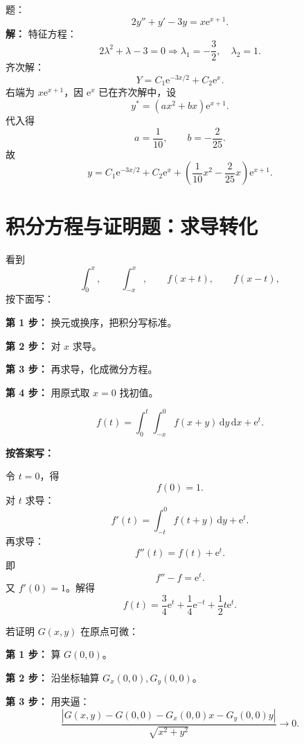 \documentclass[11pt,a4paper,UTF8]{ctexart}
\newcommand{\dd}{\,\mathrm d}
\newcommand{\ee}{\mathrm e}
\begin{document}
\begin{answerbox}[2023--2024 大题：二阶常系数非齐次]
题：
\[
2y''+y'-3y=x\ee^{x+1}.
\]
\textbf{解：}
特征方程：
\[
2\lambda^2+\lambda-3=0
\Rightarrow \lambda_1=-\frac32,\quad \lambda_2=1.
\]
齐次解：
\[
Y=C_1\ee^{-3x/2}+C_2\ee^x.
\]
右端为 \(x\ee^{x+1}\)，因 \(\ee^x\) 已在齐次解中，设
\[
y^*=(ax^2+bx)\ee^{x+1}.
\]
代入得
\[
a=\frac1{10},\qquad b=-\frac2{25}.
\]
故
\[
\boxed{y=C_1\ee^{-3x/2}+C_2\ee^x+\left(\frac1{10}x^2-\frac2{25}x\right)\ee^{x+1}}.
\]
\end{answerbox}
\section{积分方程与证明题：求导转化}

\begin{templatebox}[积分方程模板]
看到
\[
\int_0^x,\qquad \int_{-x}^{x},\qquad f(x+t),\qquad f(x-t),
\]
按下面写：

\textbf{第 1 步：} 换元或换序，把积分写标准。

\textbf{第 2 步：} 对 \(x\) 求导。

\textbf{第 3 步：} 再求导，化成微分方程。

\textbf{第 4 步：} 用原式取 \(x=0\) 找初值。
\end{templatebox}

\begin{answerbox}[例：2022--2023]
\[
f(t)=\int_0^t\int_{-x}^0f(x+y)\dd y\dd x+\ee^t.
\]

\textbf{按答案写：}

令 \(t=0\)，得
\[
f(0)=1.
\]
对 \(t\) 求导：
\[
f'(t)=\int_{-t}^0f(t+y)\dd y+\ee^t.
\]
再求导：
\[
f''(t)=f(t)+\ee^t.
\]
即
\[
f''-f=\ee^t.
\]
又 \(f'(0)=1\)。解得
\[
\boxed{f(t)=\frac34\ee^t+\frac14\ee^{-t}+\frac12t\ee^t.}
\]
\end{answerbox}

\begin{templatebox}[证明可微模板]
若证明 \(G(x,y)\) 在原点可微：

\textbf{第 1 步：} 算 \(G(0,0)\)。

\textbf{第 2 步：} 沿坐标轴算 \(G_x(0,0),G_y(0,0)\)。

\textbf{第 3 步：} 用夹逼：
\[
\frac{|G(x,y)-G(0,0)-G_x(0,0)x-G_y(0,0)y|}
{\sqrt{x^2+y^2}}\to0.
\]
\end{templatebox}
\end{document}
